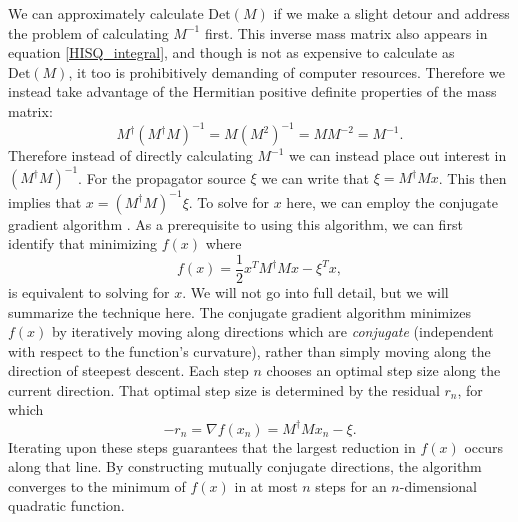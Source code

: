 We can approximately calculate $\mathrm{Det}(M)$ if we make a slight detour and address the problem of calculating $M^{-1}$ first.  This inverse mass matrix also appears in equation \ref{HISQ_integral}, and though is not as expensive to calculate as $\mathrm{Det}(M)$, it too is prohibitively demanding of computer resources.  
Therefore we instead take advantage of the Hermitian positive definite properties of the mass matrix:
\begin{equation}\label{eq:hermitian}
    M^\dagger(M^\dagger M)^{-1}=M(M^2)^{-1}=MM^{-2}=M^{-1}.
\end{equation}
Therefore instead of directly calculating $M^{-1}$ we can instead place out interest in $(M^\dagger M)^{-1}$.  For the propagator source $\xi$ we can write that $\xi = M^\dagger M x$.  This then implies that $x = (M^\dagger M)^{-1}\xi$.  To solve for $x$ here, we can employ the conjugate gradient algorithm \cite{HestenesStiefel1952}. As a prerequisite to using this algorithm, we can first identify that minimizing $f(x)$ where
\begin{equation}
    f(x) = \frac{1}{2}x^TM^\dagger Mx - \xi^T x,
\end{equation}
is equivalent to solving for $x$.  We will not go into full detail, but we will summarize the technique here. The conjugate gradient algorithm minimizes $f(x)$ by iteratively moving along directions which are \textit{conjugate} (independent with respect to the function’s curvature), rather than simply moving along the direction of steepest descent.  Each step $n$ chooses an optimal step size along the current direction.  That optimal step size is determined by the residual $r_n$, for which
\begin{equation}
    -r_n = \nabla f(x_n) = M^\dagger M x_n - \xi.
\end{equation}
Iterating upon these steps guarantees that the largest reduction in $f(x)$ occurs along that line.  By constructing mutually conjugate directions, the algorithm converges to the minimum of $f(x)$ in at most $n$ steps for an $n$-dimensional quadratic function.


